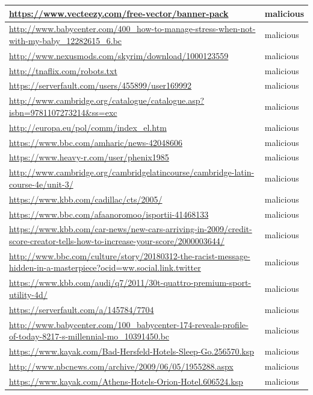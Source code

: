\documentclass[12pt,twoside]{report}
\begin{document}
\begin{spacing}{1}
\begin{center}
\begin{longtable}{ |>{\raggedright\arraybackslash}p{}|>{\raggedright\arraybackslash}p{}| }
\hline
\url{https://www.vecteezy.com/free-vector/banner-pack} & malicious
\\
\hline
\url{http://www.babycenter.com/400_how-to-manage-stress-when-not-with-my-baby_12282615_6.bc} & malicious
\\
\hline
\url{http://www.nexusmods.com/skyrim/download/1000123559} & malicious
\\
\hline
\url{http://tnaflix.com/robots.txt} & malicious
\\
\hline
\url{https://serverfault.com/users/455899/user169992} & malicious
\\
\hline
\url{http://www.cambridge.org/catalogue/catalogue.asp?isbn=9781107273214&ss=exc} & malicious
\\
\hline
\url{http://europa.eu/pol/comm/index_el.htm} & malicious
\\
\hline
\url{https://www.bbc.com/amharic/news-42048606} & malicious
\\
\hline
\url{https://www.heavy-r.com/user/phenix1985} & malicious
\\
\hline
\url{http://www.cambridge.org/cambridgelatincourse/cambridge-latin-course-4e/unit-3/} & malicious
\\
\hline
\url{https://www.kbb.com/cadillac/cts/2005/} & malicious
\\
\hline
\url{https://www.bbc.com/afaanoromoo/isportii-41468133} & malicious
\\
\hline
\url{https://www.kbb.com/car-news/new-cars-arriving-in-2009/credit-score-creator-tells-how-to-increase-your-score/2000003644/} & malicious
\\
\hline
\url{http://www.bbc.com/culture/story/20180312-the-racist-message-hidden-in-a-masterpiece?ocid=ww.social.link.twitter} & malicious
\\
\hline
\url{https://www.kbb.com/audi/q7/2011/30t-quattro-premium-sport-utility-4d/} & malicious
\\
\hline
\url{https://serverfault.com/a/145784/7704} & malicious
\\
\hline
\url{http://www.babycenter.com/100_babycenter-174-reveals-profile-of-today-8217-s-millennial-mo_10391450.bc} & malicious
\\
\hline
\url{https://www.kayak.com/Bad-Hersfeld-Hotels-Sleep-Go.256570.ksp} & malicious
\\
\hline
\url{http://www.nbcnews.com/archive/2009/06/05/1955288.aspx} & malicious
\\
\hline
\url{https://www.kayak.com/Athens-Hotels-Orion-Hotel.606524.ksp} & malicious
\\

\end{longtable}
\end{center}
\end{spacing}
\end{document}
